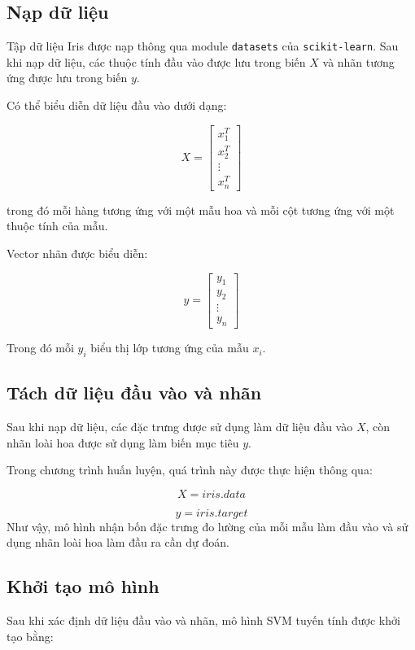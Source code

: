 \documentclass[12pt,a4paper]{report}
\begin{document}
		\subsection{Nạp dữ liệu}
		
		Tập dữ liệu Iris được nạp thông qua module \texttt{datasets} của \texttt{scikit-learn}. Sau khi nạp dữ liệu, các thuộc tính đầu vào được lưu
		trong biến $X$ và nhãn tương ứng được lưu trong biến $y$.
		
		Có thể biểu diễn dữ liệu đầu vào dưới dạng:
		
		$$
		X=
		\begin{bmatrix}
			x_1^T\\
			x_2^T\\
			\vdots\\
			x_n^T
		\end{bmatrix}
		$$
		
		trong đó mỗi hàng tương ứng với một mẫu hoa và mỗi cột tương ứng với một thuộc tính của mẫu.
		
		Vector nhãn được biểu diễn:
		
		$$
		y=
		\begin{bmatrix}
			y_1\\
			y_2\\
			\vdots\\
			y_n
		\end{bmatrix}
		$$
		
		Trong đó mỗi $y_i$ biểu thị lớp tương ứng của mẫu $x_i$.
		
		\subsection{Tách dữ liệu đầu vào và nhãn}
		
		Sau khi nạp dữ liệu, các đặc trưng được sử dụng làm dữ liệu đầu vào $X$, còn nhãn loài hoa được sử dụng làm biến mục tiêu $y$.
		
		\noindent
		Trong chương trình huấn luyện, quá trình này được thực hiện thông qua:
		
	\[
			X = iris.data		
	\]
		
	\[
			y = iris.target
	\]
		Như vậy, mô hình nhận bốn đặc trưng đo lường của mỗi mẫu làm đầu vào và sử dụng nhãn loài hoa làm đầu ra cần dự đoán.
		
		\subsection{Khởi tạo mô hình}
		
		Sau khi xác định dữ liệu đầu vào và nhãn, mô hình SVM tuyến tính được khởi tạo
		bằng:
		
\end{document}
